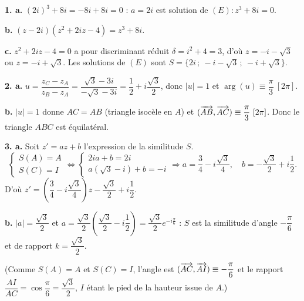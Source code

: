 \documentclass[11pt]{article}
\begin{document}

\textbf{1. a.} $(2i)^3 + 8i = -8i + 8i = 0$ : $a = 2i$ est solution de $(E) : z^3 + 8i = 0$.

\textbf{b.} $(z - 2i)(z^2 + 2iz - 4) = z^3 + 8i$.

\textbf{c.} $z^2 + 2iz - 4 = 0$ a pour discriminant réduit $\delta = i^2 + 4 = 3$, d'où $z = -i - \sqrt{3}$ ou $z = -i + \sqrt{3}$. Les solutions de $(E)$ sont $S = \{2i\,;\ -i - \sqrt{3}\,;\ -i + \sqrt{3}\}$.

\textbf{2. a.} $u = \dfrac{z_C - z_A}{z_B - z_A} = \dfrac{\sqrt{3} - 3i}{-\sqrt{3} - 3i} = \dfrac{1}{2} + i\dfrac{\sqrt{3}}{2}$, donc $|u| = 1$ et $\arg(u) \equiv \dfrac{\pi}{3}\ [2\pi]$.

\textbf{b.} $|u| = 1$ donne $AC = AB$ (triangle isocèle en $A$) et $(\vv{AB}, \vv{AC}) \equiv \dfrac{\pi}{3}\ [2\pi]$. Donc le triangle $ABC$ est équilatéral.

\textbf{3. a.} Soit $z' = az + b$ l'expression de la similitude $S$.
\[ \begin{cases} S(A) = A \\ S(C) = I \end{cases} \Leftrightarrow \begin{cases} 2ia + b = 2i \\ a(\sqrt{3} - i) + b = -i \end{cases} \Rightarrow a = \frac{3}{4} - i\frac{\sqrt{3}}{4},\quad b = -\frac{\sqrt{3}}{2} + i\frac{1}{2}. \]
D'où $z' = \left(\dfrac{3}{4} - i\dfrac{\sqrt{3}}{4}\right)z - \dfrac{\sqrt{3}}{2} + i\dfrac{1}{2}$.

\textbf{b.} $|a| = \dfrac{\sqrt{3}}{2}$ et $a = \dfrac{\sqrt{3}}{2}\left(\dfrac{\sqrt{3}}{2} - i\dfrac{1}{2}\right) = \dfrac{\sqrt{3}}{2}e^{-i\frac{\pi}{6}}$ : $S$ est la similitude d'angle $-\dfrac{\pi}{6}$ et de rapport $k = \dfrac{\sqrt{3}}{2}$.

\begin{center}
\end{center}
(Comme $S(A) = A$ et $S(C) = I$, l'angle est $(\overrightarrow{AC}, \overrightarrow{AI}) \equiv -\dfrac{\pi}{6}$ et le rapport $\dfrac{AI}{AC} = \cos\dfrac{\pi}{6} = \dfrac{\sqrt{3}}{2}$, $I$ étant le pied de la hauteur issue de $A$.)
\end{document}
